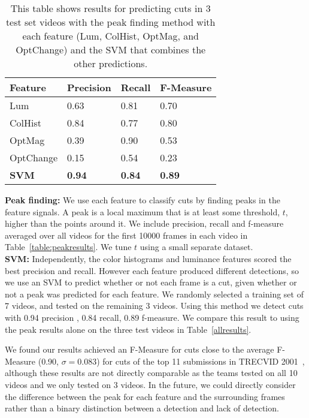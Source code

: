 \begin{table}[h!]
  \begin{center}
  	\small{
	\begin{tabular}{l|lll}
	Feature   & Precision  & Recall     & F-Measure  \\ \hline
	Lum       & 0.63      & 0.81   & 0.70      \\
	ColHist   & 0.84      & 0.77   & 0.80      \\
	OptMag    & 0.39      & 0.90   & 0.53      \\
	OptChange & 0.15      & 0.54   & 0.23      \\
	\textbf{SVM} & \textbf{0.94} & \textbf{0.84} & \textbf{0.89}\\ \hline
	\end{tabular}
	}
  \end{center}
  \label{table:allresults}
  \caption{This table shows results for predicting cuts in 3 test set videos with the peak finding method with each feature (Lum, ColHist, OptMag, and OptChange) and the SVM that combines the other predictions.}
\end{table} 

\noindent \textbf{Peak finding:} We use each feature to classify cuts by finding peaks in the feature signals. A peak is a local maximum that is at least some threshold, $t$, higher than the points around it. We include precision, recall and f-measure averaged over all videos for the first 10000 frames in each video in Table~\ref{table:peakresults}. We tune $t$ using a small separate dataset.\\

\noindent \textbf{SVM:} Independently, the color histograms and luminance features scored the best precision and recall. However each feature produced different detections, so we use an SVM to predict whether or not each frame is a cut, given whether or not a peak was predicted for each feature. We randomly selected a training set of 7 videos, and tested on the remaining 3 videos. Using this method we detect cuts with 0.94 precision , 0.84 recall, 0.89 f-measure. We compare this result to using the peak results alone on the three test videos in Table~\ref{allresults}. 

We found our results achieved an F-Measure for cuts close to the average F-Measure (0.90, $\sigma = 0.083$) for cuts of the top 11 submissions in TRECVID 2001~\cite{quenot2001trec}, although these results are not directly comparable as the teams tested on all 10 videos and we only tested on 3 videos. 
In the future, we could directly consider the difference between the peak for each feature and the surrounding frames rather than a binary distinction between a detection and lack of detection. 

